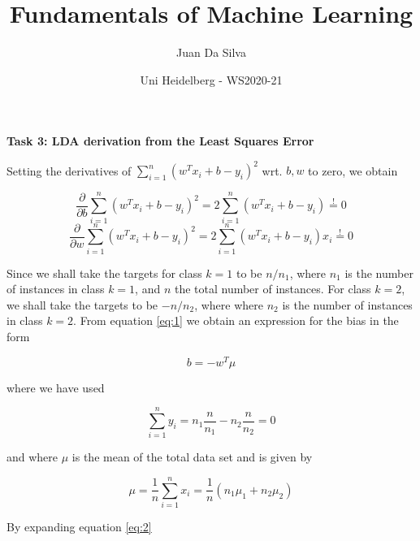 \documentclass[10pt]{article}
\title{Fundamentals of Machine Learning}
\author{Juan Da Silva}
\date{Uni Heidelberg - WS2020-21}
\begin{document}
\maketitle

\noindent\textbf{Task 3: LDA derivation from the Least Squares Error}

\noindent Setting the derivatives of $\sum_{i=1}^n\left(w^Tx_i+b-y_i\right)^2$ wrt. $b, w$ to zero, we obtain

\begin{equation} \label{eq:1}
    \frac{\partial}{\partial b}\sum_{i=1}^n\left(w^Tx_i+b-y_i\right)^2 = 2\sum_{i=1}^n\left(w^Tx_i+b-y_i\right) \stackrel{!}{=} 0
\end{equation}
\begin{equation} \label{eq:2}
    \frac{\partial}{\partial w}\sum_{i=1}^n\left(w^Tx_i+b-y_i\right)^2 = 2\sum_{i=1}^n\left(w^Tx_i+b-y_i\right)x_i \stackrel{!}{=} 0
\end{equation}

\noindent Since we shall take the targets for class $k=1$ to be $n/n_1$, where $n_1$ is the number of instances in class $k=1$, and $n$ the total number of instances. For class $k=2$, we shall take the targets to be $-n/n_2$, where where $n_2$ is the number of instances in class $k=2$. From equation \ref{eq:1} we obtain an expression for the bias in the form

\begin{equation}
    b = -w^T\mu
\end{equation}

\noindent where we have used

\begin{equation}
    \sum_{i=1}^ny_i = n_1 \frac{n}{n_1}-n_2 \frac{n}{n_2}=0
\end{equation}

\noindent and where $\mu$ is the mean of the total data set and is given by

\begin{equation}
    \mu = \frac{1}{n}\sum_{i=1}^n x_i = \frac{1}{n}\left(n_1\mu_1 + n_2\mu_2  \right)
\end{equation}

\noindent By expanding equation \ref{eq:2}
\end{document}
